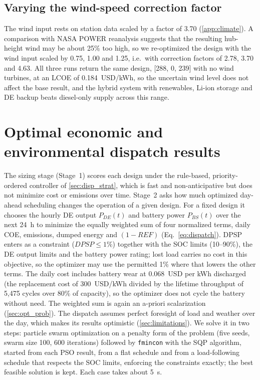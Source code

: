 \documentclass[final,3p,times]{elsarticle}
\begin{document}
\subsection{Varying the wind-speed correction factor\label{sec:windsens}}
The wind input rests on station data scaled by a factor of 3.70 (\cref{app:climate}). A comparison with NASA POWER reanalysis suggests that the resulting hub-height wind may be about 25\% too high, so we re-optimized the design with the wind input scaled by 0.75, 1.00 and 1.25, i.e.\ with correction factors of 2.78, 3.70 and 4.63. All three runs return the same design, [288, 0, 239] with no wind turbines, at an LCOE of 0.184~USD/kWh, so the uncertain wind level does not affect the base result, and the hybrid system with renewables, Li-ion storage and DE backup beats diesel-only supply across this range.

\section{\label{sec:dispatch_opt} Optimal economic and environmental dispatch results}

The sizing stage (Stage~1) scores each design under the rule-based, priority-ordered controller of \cref{sec:disp_strat}, which is fast and non-anticipative but does not minimize cost or emissions over time. Stage~2 asks how much optimized day-ahead scheduling changes the operation of a given design. For a fixed design it chooses the hourly DE output $P_{DE}(t)$ and battery power $P_{BS}(t)$ over the next 24~h to minimize the equally weighted sum of four normalized terms, daily COE, emissions, dumped energy and $(1-REF)$ (Eq.~\ref{eq:dispatch}). DPSP enters as a constraint ($DPSP \leq 1\%$) together with the SOC limits (10--90\%), the DE output limits and the battery power rating; lost load carries no cost in this objective, so the optimizer may use the permitted 1\% where that lowers the other terms. The daily cost includes battery wear at 0.068~USD per kWh discharged (the replacement cost of 300~USD/kWh divided by the lifetime throughput of 5,475 cycles over 80\% of capacity), so the optimizer does not cycle the battery without need. The weighted sum is again an a-priori scalarization (\cref{sec:opt_prob}). The dispatch assumes perfect foresight of load and weather over the day, which makes its results optimistic (\cref{sec:limitations}). We solve it in two steps: particle swarm optimization on a penalty form of the problem (five seeds, swarm size 100, 600 iterations) followed by \texttt{fmincon} with the SQP algorithm, started from each PSO result, from a flat schedule and from a load-following schedule that respects the SOC limits, enforcing the constraints exactly; the best feasible solution is kept. Each case takes about 5~s.
\end{document}
